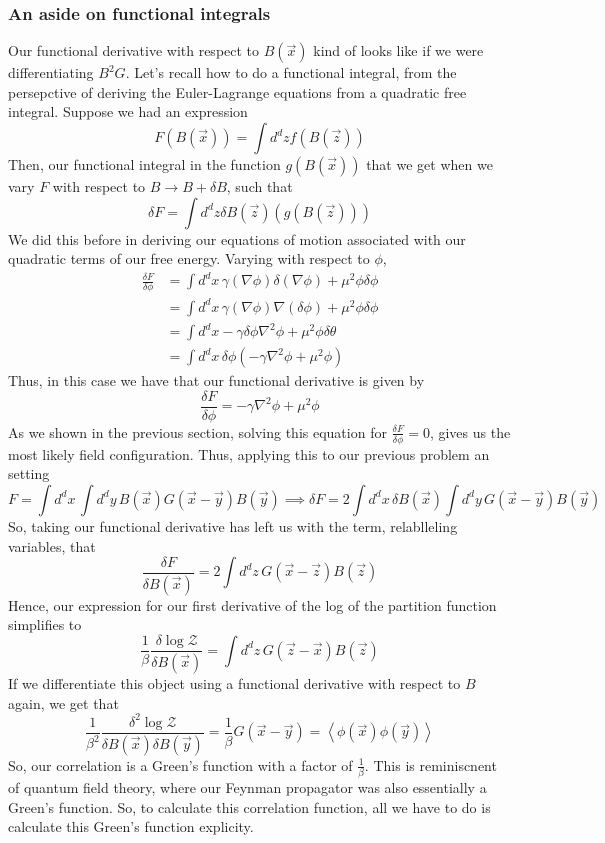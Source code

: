 \subsubsection{An aside on functional integrals} 
Our functional derivative with respect to $ B ( \vec{x} ) $ kind of looks like if we were differentiating
$ B ^2 G $. 
Let's recall how to do a functional integral, from the persepctive of deriving the 
Euler-Lagrange equations from a quadratic free integral. Suppose we had 
an expression 
\[
	F ( B ( \vec{x} ) ) = \int d^ d z f ( B ( \vec{z} ) ) 
\] Then, our functional integral in the function $ g ( B ( \vec{x} ) ) $ 
that we get when we vary $ F $ with respect to $ B \to B + \delta B $, such that 
 \[
	 \delta F = \int d^ d z \delta B ( \vec{z} ) ( g ( B ( \vec{z} ) ) ) 
\] We did this before in deriving our equations of motion associated 
with our quadratic terms of our free energy. Varying with respect to 
$ \phi $, 
\begin{align*}
	\frac{ \delta F }{ \delta \phi } &=  \int d^ d x \, \gamma ( \nabla  \phi ) \delta ( \nabla  \phi ) +\mu ^ 2   \phi \delta \phi  \\
					 &=  \int d^ d x \, \gamma ( \nabla  \phi ) \nabla  ( \delta \phi ) + \mu ^ 2  \phi \delta \phi \\
					 &= \int d^ d x  - \gamma \delta \phi \nabla ^ 2 \phi + \mu ^ 2 \phi \delta \theta \\
					 &=  \int d^ d x \, \delta \phi ( - \gamma \nabla  ^ 2 \phi + \mu ^ 2 \phi ) 
\end{align*} Thus, in this case 
we have that our functional derivative is given by 
\[
 \frac{ \delta F  }{ \delta \phi } = - \gamma \nabla  ^ 2 \phi + \mu ^ 2 \phi 
\] 
As we shown in the previous section, solving this equation for 
$ \frac{ \delta F }{ \delta \phi }  = 0 $, gives us the most likely field configuration.
Thus, applying this to our previous problem an setting 
\[
	F = \int d^ d x \, \int d^ d y \, B ( \vec{x} ) G ( \vec{x} - \vec{y} ) B ( \vec{y} ) \implies \delta F = 2 \int d^ d x \,  \delta B ( \vec{x} ) \int d^ d y \, G ( \vec{x} - \vec{y} ) B ( \vec{y} )  
\] So, taking our functional derivative has left us 
with the term, relablleling variables, that  
\[
	\frac{ \delta F }{ \delta B ( \vec{x} ) } = 2 \int d^ d z \, G ( \vec{x} - \vec{z}) B ( \vec{z} )  
\] Hence, our expression for our first derivative of the log of the 
partition function simplifies to 
\[
	\frac{1}{ \beta } \frac{ \delta \log \mathcal{ Z } }{ \delta B ( \vec{x} ) } = \int d^ d z \, G ( \vec{z} - \vec{x} ) B ( \vec{z} ) 
\] If we differentiate this object using a functional derivative with respect to 
$ B $ again, we get that 
\[
	\frac{1}{ \beta ^ 2 } \frac{ \delta ^ 2 \log \mathcal{ Z } }{ \delta B ( \vec{x} ) \delta B ( \vec{y} ) } = \frac{1}{ \beta } G ( \vec{x} - \vec{y} ) = \left< \phi ( \vec{x} ) \phi ( \vec{y} )  \right> 
\] So, our correlation is a Green's function 
with a factor of $ \frac{1}{ \beta  }$. This 
is reminiscnent of quantum field theory, where our Feynman propagator 
was also essentially a Green's function. 
So, to calculate this correlation function, all we have to do 
is calculate this Green's function explicity. 


